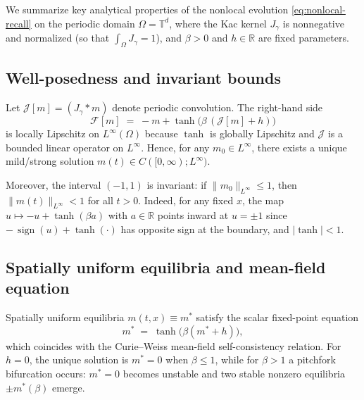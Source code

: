 \documentclass[11pt,a4paper]{article}
\begin{document}
We summarize key analytical properties of the nonlocal evolution \eqref{eq:nonlocal-recall} on the periodic domain $\Omega=\mathbb{T}^d$, where the Kac kernel $J_\gamma$ is nonnegative and normalized (so that $\int_\Omega J_\gamma = 1$), and $\beta>0$ and $h\in\mathbb{R}$ are fixed parameters.

\subsection{Well-posedness and invariant bounds}
Let $\mathcal{J}[m] = (J_\gamma * m)$ denote periodic convolution. The right-hand side
\[
\mathcal{F}[m] \;=\; -m + \tanh\big(\beta\,(\mathcal{J}[m] + h)\big)
\]
is locally Lipschitz on $L^\infty(\Omega)$ because $\tanh$ is globally Lipschitz and $\mathcal{J}$ is a bounded linear operator on $L^\infty$. Hence, for any $m_0\in L^\infty$, there exists a unique mild/strong solution $m(t)\in C([0,\infty);L^\infty)$.

Moreover, the interval $(-1,1)$ is invariant: if $\|m_0\|_{L^\infty}\le 1$, then $\|m(t)\|_{L^\infty}<1$ for all $t>0$. Indeed, for any fixed $x$, the map $u\mapsto -u+\tanh(\beta a)$ with $a\in\mathbb{R}$ points inward at $u=\pm1$ since $-\,\operatorname{sign}(u)+\tanh(\cdot)$ has opposite sign at the boundary, and $|\tanh|<1$.

\subsection{Spatially uniform equilibria and mean-field equation}
Spatially uniform equilibria $m(t,x)\equiv m^*$ satisfy the scalar fixed-point equation
\begin{equation}\label{eq:mf_fp}
 m^* \;=\; \tanh\big(\beta(m^* + h)\big),
\end{equation}
which coincides with the Curie--Weiss mean-field self-consistency relation. For $h=0$, the unique solution is $m^*=0$ when $\beta\le1$, while for $\beta>1$ a pitchfork bifurcation occurs: $m^*=0$ becomes unstable and two stable nonzero equilibria $\pm m^*(\beta)$ emerge.
\end{document}

